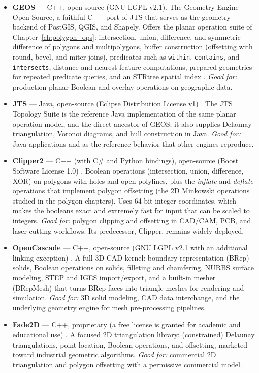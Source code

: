 \begin{itemize}
  \item \textbf{GEOS} --- C++, open-source (GNU LGPL v2.1). The Geometry
    Engine Open Source, a faithful C++ port of JTS that serves as the
    geometry backend of PostGIS, QGIS, and Shapely. Offers the planar
    operation suite of Chapter~\ref{ch:polygon_ops}: intersection,
    union, difference, and symmetric difference of polygons and
    multipolygons, buffer construction (offsetting with round, bevel,
    and miter joins), predicates such as \texttt{within},
    \texttt{contains}, and \texttt{intersects}, distance and nearest
    feature computations, prepared geometries for repeated predicate
    queries, and an STRtree spatial index \cite{geos}. \emph{Good for:}
    production planar Boolean and overlay operations on geographic data.
  \item \textbf{JTS} --- Java, open-source (Eclipse Distribution License
    v1) \cite{jts}. The JTS Topology Suite is the reference Java
    implementation of the same planar operation model, and the direct
    ancestor of GEOS; it also supplies Delaunay triangulation, Voronoi
    diagrams, and hull construction in Java. \emph{Good for:} Java
    applications and as the reference behavior that other engines
    reproduce.
  \item \textbf{Clipper2} --- C++ (with C\# and Python bindings),
    open-source (Boost Software License 1.0) \cite{clipper2}. Boolean
    operations (intersection, union, difference, XOR) on polygons with
    holes and open polylines, plus the \emph{inflate} and \emph{deflate}
    operations that implement polygon offsetting (the 2D Minkowski
    operations studied in the polygon chapters). Uses 64-bit integer
    coordinates, which makes the booleans exact and extremely fast for
    input that can be scaled to integers. \emph{Good for:} polygon
    clipping and offsetting in CAD/CAM, PCB, and laser-cutting
    workflows. Its predecessor, Clipper, remains widely deployed.
  \item \textbf{OpenCascade} --- C++, open-source (GNU LGPL v2.1 with an
    additional linking exception) \cite{opencascade}. A full 3D CAD
    kernel: boundary representation (BRep) solids, Boolean operations on
    solids, filleting and chamfering, NURBS surface modeling, STEP and
    IGES import/export, and a built-in mesher (BRepMesh) that turns BRep
    faces into triangle meshes for rendering and simulation.
    \emph{Good for:} 3D solid modeling, CAD data interchange, and the
    underlying geometry engine for mesh pre-processing pipelines.
  \item \textbf{Fade2D} --- C++, proprietary (a free license is granted
    for academic and educational use) \cite{fade2d}. A focused 2D
    triangulation library: (constrained) Delaunay triangulations, point
    location, Boolean operations, and offsetting, marketed toward
    industrial geometric algorithms. \emph{Good for:} commercial 2D
    triangulation and polygon offsetting with a permissive commercial
    model.
\end{itemize}

